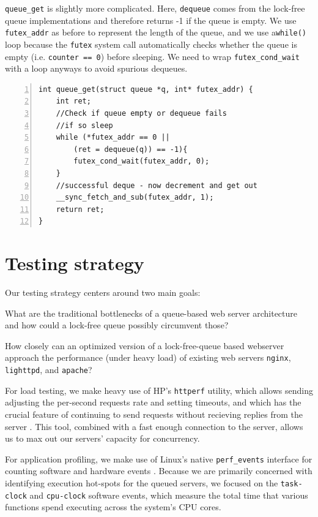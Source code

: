 \documentclass[twoside,10pt]{article}
\begin{document}
\begin{multicols}{2}
\verb+queue_get+ is slightly more complicated. Here, \verb+dequeue+
comes from the lock-free queue implementations and therefore returns -1 if the
queue is empty. We use \verb+futex_addr+ as before to represent the length of the queue, and we use a\verb+while()+ loop
because the \verb+futex+ system call automatically checks whether the
queue is empty (i.e.  \verb+counter == 0+) before sleeping. We need to
wrap \verb+futex_cond_wait+ with a loop anyways to avoid spurious dequeues.


\begin{Verbatim}[numbers=left,
                 fontsize=\small]
int queue_get(struct queue *q, int* futex_addr) {
    int ret;
    //Check if queue empty or dequeue fails
    //if so sleep  
    while (*futex_addr == 0 || 
        (ret = dequeue(q)) == -1){
        futex_cond_wait(futex_addr, 0);
    }
    //successful deque - now decrement and get out 
    __sync_fetch_and_sub(futex_addr, 1);
    return ret; 
}
\end{Verbatim}

\section{Testing strategy}

Our testing strategy centers around two main goals:

\begin{compactitem}
\item What are the traditional bottlenecks of a queue-based web server
  architecture and how could a lock-free queue possibly circumvent
  those?
\item How closely can an optimized version of a lock-free-queue based
  webserver approach the performance (under heavy load) of existing
  web servers \verb+nginx+, \verb+lighttpd+, and \verb+apache+?
\end{compactitem}

For load testing, we make heavy use of HP's \verb+httperf+ utility,
which allows sending adjusting the per-second requests rate and
setting timeouts, and which has the crucial feature of continuing to
send requests without recieving replies from the server
\cite{mosberger1998httperf}. This tool, combined with a fast enough
connection to the server, allows us to max out our servers' capacity
for concurrency.

For application profiling, we make use of Linux's native
\verb+perf_events+ interface for counting software and hardware events
\cite{weaver2013linux}. Because we are primarily concerned with
identifying execution hot-spots for the queued servers, we focused on
the \verb+task-clock+ and \verb+cpu-clock+ software events, which
measure the total time that various functions spend executing across
the system's CPU cores. 


\end{multicols}
\end{document}
